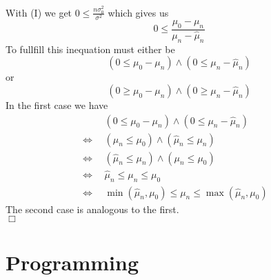 \documentclass{article}
\begin{document}
With (I) we get
$0 \leq \frac{n\sigma^2_0}{\sigma^2}$ 
which gives us
$$0 \leq \frac{\mu_0 - \mu_n}{\mu_n - \hat{\mu}_n}$$
To fullfill this inequation must either  be 
$$(0 \leq \mu_0 - \mu_n) \wedge (0 \leq \mu_n - \hat{\mu}_n)$$ 
or 
$$(0 \geq \mu_0 - \mu_n) \wedge (0 \geq \mu_n - \hat{\mu}_n)$$
In the first case we have
\begin{align*}
                 &(0 \leq \mu_0 - \mu_n) \wedge (0 \leq \mu_n - \hat{\mu}_n)&\\
\Leftrightarrow~~&(\mu_n \leq \mu_0 ) \wedge (\hat{\mu}_n \leq \mu_n )&\\
\Leftrightarrow~~&(\hat{\mu}_n \leq \mu_n ) \wedge (\mu_n \leq \mu_0 )&\\
\Leftrightarrow~~&\hat{\mu}_n \leq \mu_n \leq \mu_0 &\\
\Leftrightarrow~~& \min(\hat{\mu}_n,\mu_0) \leq \mu_n \leq  \max(\hat{\mu}_n,\mu_0)& 
\end{align*}
The second case is analogous to the first.\\
\hspace*{\fill}$\Box$
\section{Programming}


%

%

\end{document}
